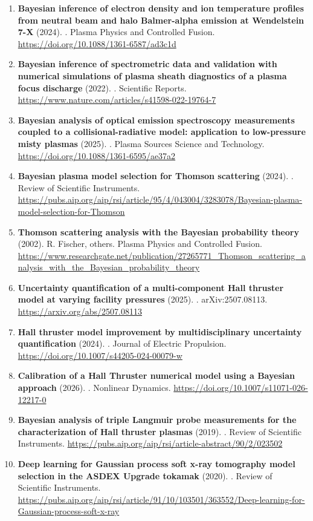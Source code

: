 \documentclass[11pt,a4paper]{article}
\begin{document}
\begin{enumerate}[leftmargin=1.4em]
\item \textbf{Bayesian inference of electron density and ion temperature profiles from neutral beam and halo Balmer-alpha emission at Wendelstein 7-X} (2024). . Plasma Physics and Controlled Fusion. \url{https://doi.org/10.1088/1361-6587/ad3c1d}
\item \textbf{Bayesian inference of spectrometric data and validation with numerical simulations of plasma sheath diagnostics of a plasma focus discharge} (2022). . Scientific Reports. \url{https://www.nature.com/articles/s41598-022-19764-7}
\item \textbf{Bayesian analysis of optical emission spectroscopy measurements coupled to a collisional-radiative model: application to low-pressure misty plasmas} (2025). . Plasma Sources Science and Technology. \url{https://doi.org/10.1088/1361-6595/ae37a2}
\item \textbf{Bayesian plasma model selection for Thomson scattering} (2024). . Review of Scientific Instruments. \url{https://pubs.aip.org/aip/rsi/article/95/4/043004/3283078/Bayesian-plasma-model-selection-for-Thomson}
\item \textbf{Thomson scattering analysis with the Bayesian probability theory} (2002). R. Fischer, others. Plasma Physics and Controlled Fusion. \url{https://www.researchgate.net/publication/27265771_Thomson_scattering_analysis_with_the_Bayesian_probability_theory}
\item \textbf{Uncertainty quantification of a multi-component Hall thruster model at varying facility pressures} (2025). . arXiv:2507.08113. \url{https://arxiv.org/abs/2507.08113}
\item \textbf{Hall thruster model improvement by multidisciplinary uncertainty quantification} (2024). . Journal of Electric Propulsion. \url{https://doi.org/10.1007/s44205-024-00079-w}
\item \textbf{Calibration of a Hall Thruster numerical model using a Bayesian approach} (2026). . Nonlinear Dynamics. \url{https://doi.org/10.1007/s11071-026-12217-0}
\item \textbf{Bayesian analysis of triple Langmuir probe measurements for the characterization of Hall thruster plasmas} (2019). . Review of Scientific Instruments. \url{https://pubs.aip.org/aip/rsi/article-abstract/90/2/023502}
\item \textbf{Deep learning for Gaussian process soft x-ray tomography model selection in the ASDEX Upgrade tokamak} (2020). . Review of Scientific Instruments. \url{https://pubs.aip.org/aip/rsi/article/91/10/103501/363552/Deep-learning-for-Gaussian-process-soft-x-ray}

\end{enumerate}
\end{document}
